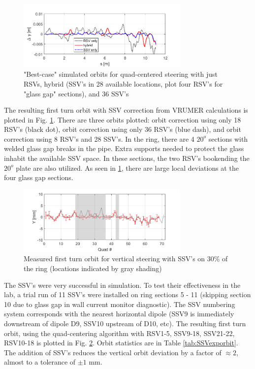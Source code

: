 \begin{figure}[htb]
\centering
\includegraphics[width=0.75\textwidth]{6.figures/SSV/orbit_uneven_ssvs.png}
\caption{"Best-case" simulated orbits for quad-centered steering with just RSVs, hybrid (SSV's in 28 available locations, plot four RSV's for "glass gap" sections), and 36 SSV's}
\label{fig:SSVsimorbit}
\end{figure}

The resulting first turn orbit with SSV correction from VRUMER calculations is plotted in Fig. \ref{fig:SSVsimorbit}. There are three orbits plotted: orbit correction using only 18 RSV's (black dot), orbit correction using only 36 RSV's (blue dash), and orbit correction using 8 RSV's and 28 SSV's. In the ring, there are 4 $20^o$ sections with welded glass gap breaks in the pipe. Extra supports needed to protect the glass inhabit the available SSV space. In these sections, the two RSV's bookending the $20^o$ plate are also utilized. As seen in \ref{fig:SSVsimorbit}, there are large local deviations at the four glass gap sections.


\begin{figure}[htb]
\centering
\includegraphics[width=0.75\textwidth]{6.figures/SSV/vert_steering_with_ssv_170831.png}
\caption{Measured first turn orbit for vertical steering with SSV's on 30\% of the ring (locations indicated by gray shading)}
\label{fig:SSVexporbit}
\end{figure}

The SSV's were very successful in simulation. To test their effectiveness in the lab, a trial run of 11 SSV's were installed on ring sections 5 - 11 (skipping section 10 due to glass gap in wall current monitor diagnostic). The SSV numbering system corresponds with the nearest horizontal dipole (SSV9 is immediately downstream of dipole D9, SSV10 upstream of D10, etc). The resulting first turn orbit, using the quad-centering algorithm with RSV1-5, SSV9-18, SSV21-22, RSV10-18 is plotted in Fig. \ref{fig:SSVexporbit}. Orbit statistics are in Table \ref{tab:SSVexporbit}. The addition of SSV's reduces the vertical orbit deviation by a factor of $\approx 2$, almost to a tolerance of $\pm 1$ mm.   

